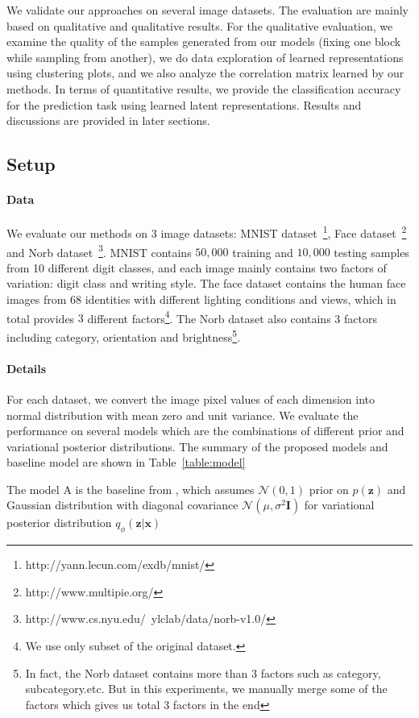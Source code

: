 We validate our approaches on several image datasets.  The evaluation are mainly based on qualitative and qualitative results. For the qualitative evaluation, we examine the quality of the samples generated from our models (fixing one block while sampling from another), we do data exploration of learned representations using clustering plots, and we also analyze the correlation matrix learned by our methods. In terms of quantitative results, we provide the classification accuracy for the prediction task using learned latent representations. Results and discussions are provided in later sections.

\subsection{Setup}
\paragraph{Data} We evaluate our methods on $3$ image datasets: MNIST dataset~\footnote{http://yann.lecun.com/exdb/mnist/}, Face dataset~\footnote{http://www.multipie.org/} and Norb dataset~\footnote{http://www.cs.nyu.edu/~ylclab/data/norb-v1.0/}. MNIST contains $50,000$ training and $10,000$ testing samples from 10 different digit classes, and each image mainly contains two factors of variation: digit class and writing style. The face dataset contains the human face images from $68$ identities with different lighting conditions and views, which in total provides $3$ different factors\footnote{We use only subset of the original dataset.}. The Norb dataset also contains 3 factors including category, orientation and brightness\footnote{In fact, the Norb dataset contains more than 3 factors such as category, subcategory.etc. But in this experiments, we manually merge some of the factors which gives us total 3 factors in the end}.

\paragraph{Details} For each dataset, we convert the image pixel values of each dimension into normal distribution with mean zero and unit variance. We evaluate the performance on several models which are the combinations of different prior and variational posterior distributions. The summary of the proposed models and baseline model are shown in Table~\ref{table:model}

The model A is the baseline from \cite{kingma2013auto}, which assumes $\mathcal{N}(0,1)$ prior on $p(\mathbf{z})$ and Gaussian distribution with diagonal covariance $\mathcal{N}(\mu, \sigma^2\mathbf{I})$ for variational posterior distribution $q_{\phi}(\mathbf{z}|\mathbf{x})$


